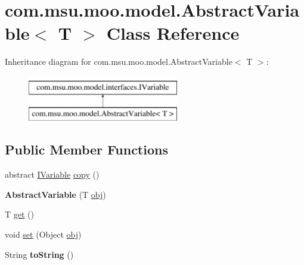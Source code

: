 \hypertarget{classcom_1_1msu_1_1moo_1_1model_1_1AbstractVariable_3_01T_01_4}{\section{com.\-msu.\-moo.\-model.\-Abstract\-Variable$<$ T $>$ Class Reference}
\label{classcom_1_1msu_1_1moo_1_1model_1_1AbstractVariable_3_01T_01_4}
}
Inheritance diagram for com.\-msu.\-moo.\-model.\-Abstract\-Variable$<$ T $>$\-:\begin{figure}[H]
\begin{center}
\leavevmode
\includegraphics[height=2.000000cm]{classcom_1_1msu_1_1moo_1_1model_1_1AbstractVariable_3_01T_01_4}
\end{center}
\end{figure}
\subsection*{Public Member Functions}
\begin{DoxyCompactItemize}
\item 
abstract \hyperlink{interfacecom_1_1msu_1_1moo_1_1model_1_1interfaces_1_1IVariable}{I\-Variable} \hyperlink{classcom_1_1msu_1_1moo_1_1model_1_1AbstractVariable_3_01T_01_4_ab11df1a0613f42b0f1aed2226c666da2}{copy} ()
\item 
\hypertarget{classcom_1_1msu_1_1moo_1_1model_1_1AbstractVariable_3_01T_01_4_a12d90648f8d83ad81de5f807140fcf62}{{\bfseries Abstract\-Variable} (T \hyperlink{classcom_1_1msu_1_1moo_1_1model_1_1AbstractVariable_3_01T_01_4_ad584ca2577d331fbf04449fdcf2b6ed9}{obj})}\label{classcom_1_1msu_1_1moo_1_1model_1_1AbstractVariable_3_01T_01_4_a12d90648f8d83ad81de5f807140fcf62}

\item 
T \hyperlink{classcom_1_1msu_1_1moo_1_1model_1_1AbstractVariable_3_01T_01_4_a4c969f78e29f71436eb1f2db62fd43c5}{get} ()
\item 
void \hyperlink{classcom_1_1msu_1_1moo_1_1model_1_1AbstractVariable_3_01T_01_4_ad3b3dfcb1027411ca8adc0a2e82a42d2}{set} (Object \hyperlink{classcom_1_1msu_1_1moo_1_1model_1_1AbstractVariable_3_01T_01_4_ad584ca2577d331fbf04449fdcf2b6ed9}{obj})
\item 
\hypertarget{classcom_1_1msu_1_1moo_1_1model_1_1AbstractVariable_3_01T_01_4_a541a74317afb7a5296df1be518ca007b}{String {\bfseries to\-String} ()}\label{classcom_1_1msu_1_1moo_1_1model_1_1AbstractVariable_3_01T_01_4_a541a74317afb7a5296df1be518ca007b}

\end{DoxyCompactItemize}
